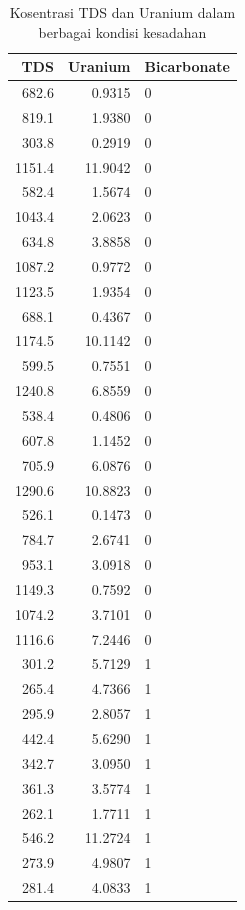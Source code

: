 \documentclass[]{book}
\begin{document}
\begin{table}[t]

\caption{\label{tab:gwtdsur}Kosentrasi TDS dan Uranium dalam berbagai kondisi kesadahan}
\centering
\begin{tabular}{r|r|l}
\hline
TDS & Uranium & Bicarbonate\\
\hline
682.6 & 0.9315 & 0\\
\hline
819.1 & 1.9380 & 0\\
\hline
303.8 & 0.2919 & 0\\
\hline
1151.4 & 11.9042 & 0\\
\hline
582.4 & 1.5674 & 0\\
\hline
1043.4 & 2.0623 & 0\\
\hline
634.8 & 3.8858 & 0\\
\hline
1087.2 & 0.9772 & 0\\
\hline
1123.5 & 1.9354 & 0\\
\hline
688.1 & 0.4367 & 0\\
\hline
1174.5 & 10.1142 & 0\\
\hline
599.5 & 0.7551 & 0\\
\hline
1240.8 & 6.8559 & 0\\
\hline
538.4 & 0.4806 & 0\\
\hline
607.8 & 1.1452 & 0\\
\hline
705.9 & 6.0876 & 0\\
\hline
1290.6 & 10.8823 & 0\\
\hline
526.1 & 0.1473 & 0\\
\hline
784.7 & 2.6741 & 0\\
\hline
953.1 & 3.0918 & 0\\
\hline
1149.3 & 0.7592 & 0\\
\hline
1074.2 & 3.7101 & 0\\
\hline
1116.6 & 7.2446 & 0\\
\hline
301.2 & 5.7129 & 1\\
\hline
265.4 & 4.7366 & 1\\
\hline
295.9 & 2.8057 & 1\\
\hline
442.4 & 5.6290 & 1\\
\hline
342.7 & 3.0950 & 1\\
\hline
361.3 & 3.5774 & 1\\
\hline
262.1 & 1.7711 & 1\\
\hline
546.2 & 11.2724 & 1\\
\hline
273.9 & 4.9807 & 1\\
\hline
281.4 & 4.0833 & 1\\
\hline

\end{tabular}
\end{table}
\end{document}

